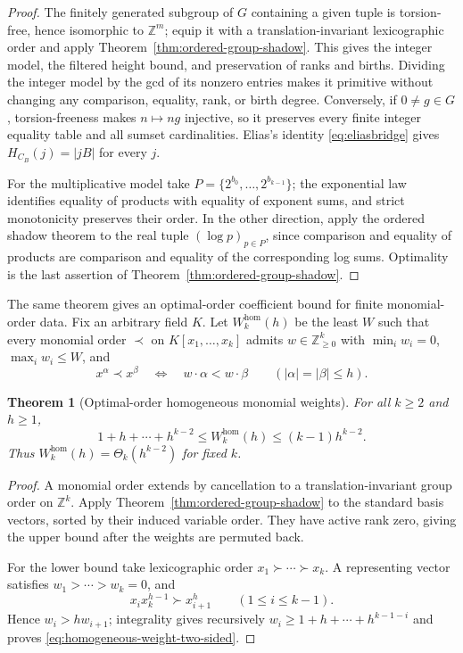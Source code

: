 \documentclass[11pt,reqno]{amsart}
\newtheorem{theorem}{Theorem}[section]
\theoremstyle{definition}
\theoremstyle{remark}
\begin{document}
\begin{proof}
The finitely generated subgroup of $G$ containing a given tuple is
torsion-free, hence isomorphic to $\mathbb Z^m$; equip it with a
translation-invariant lexicographic order and apply
Theorem~\ref{thm:ordered-group-shadow}.  This gives the integer model,
the filtered height bound, and preservation of ranks and births.  Dividing
the integer model by the gcd of its nonzero entries makes it primitive without
changing any comparison, equality, rank, or birth degree.  Conversely,
if $0\ne g\in G$, torsion-freeness makes $n\mapsto ng$ injective, so it
preserves every finite integer equality table and all sumset cardinalities.
Elias's identity \eqref{eq:eliasbridge} gives
$H_{C_B}(j)=|jB|$ for every $j$.

For the multiplicative model take $P=\{2^{b_0},\ldots,2^{b_{k-1}}\}$;
the exponential law identifies equality of products with equality of exponent
sums, and strict monotonicity preserves their order.  In the other direction,
apply the ordered
shadow theorem to the real tuple $(\log p)_{p\in P}$, since comparison and
equality of products are comparison and equality of the corresponding log
sums.  Optimality is the last assertion of
Theorem~\ref{thm:ordered-group-shadow}.
\end{proof}

The same theorem gives an optimal-order coefficient bound for finite
monomial-order data.  Fix an arbitrary field $K$.  Let
$W_k^{\mathrm{hom}}(h)$ be the least $W$ such
that every monomial order $\prec$ on $K[x_1,\ldots,x_k]$ admits
$w\in\mathbb Z_{\geq0}^k$ with $\min_iw_i=0$, $\max_iw_i\leq W$, and
\[
 x^\alpha\prec x^\beta
 \quad\Longleftrightarrow\quad
 w\cdot\alpha<w\cdot\beta
 \qquad(|\alpha|=|\beta|\leq h).
\]

\begin{theorem}[Optimal-order homogeneous monomial weights]
\label{thm:homogeneous-monomial-weight-complexity}
For all $k\geq2$ and $h\geq1$,
\begin{equation}\label{eq:homogeneous-weight-two-sided}
 1+h+\cdots+h^{k-2}
 \leq W_k^{\mathrm{hom}}(h)
 \leq(k-1)h^{k-2}.
\end{equation}
Thus $W_k^{\mathrm{hom}}(h)=\Theta_k(h^{k-2})$ for fixed $k$.
\end{theorem}

\begin{proof}
A monomial order extends by cancellation to a translation-invariant group
order on $\mathbb Z^k$.  Apply Theorem~\ref{thm:ordered-group-shadow} to
the standard basis vectors, sorted by their induced variable order.  They
have active rank zero, giving the upper bound after the weights are permuted
back.

For the lower bound take lexicographic order
$x_1\succ\cdots\succ x_k$.  A representing vector satisfies
$w_1>\cdots>w_k=0$, and
\[
 x_i x_k^{h-1}\succ x_{i+1}^h
 \qquad(1\leq i\leq k-1).
\]
Hence $w_i>hw_{i+1}$; integrality gives recursively
$w_i\geq1+h+\cdots+h^{k-1-i}$ and proves
\eqref{eq:homogeneous-weight-two-sided}.
\end{proof}
\end{document}
